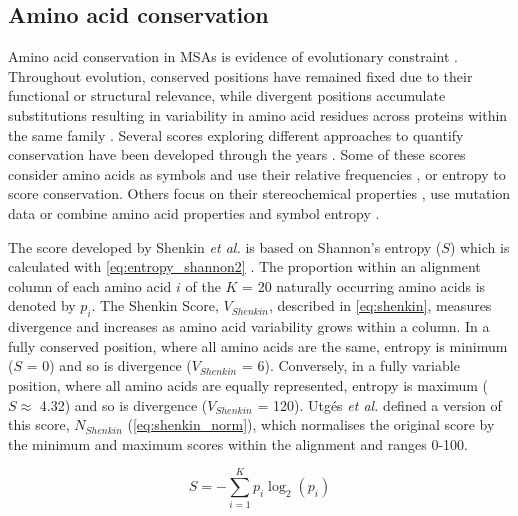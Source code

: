 \subsection{Amino acid conservation}

Amino acid conservation in MSAs is evidence of evolutionary constraint \cite{DAYHOFF_1978_PAM}. Throughout evolution, conserved positions have remained fixed due to their functional or structural relevance, while divergent positions accumulate substitutions resulting in variability in amino acid residues across proteins within the same family \cite{ZUCKERKANDL_1965_DIVERGENCE}. Several scores exploring different approaches to quantify conservation have been developed through the years \cite{VALDAR_2002_SCORES}. Some of these scores consider amino acids as symbols and use their relative frequencies \cite{WU_1970_SCORE, JORES_1990_SCORE, LOCKLESS_1999_SCORE}, or entropy \cite{SANDER_1991_SCORE, SHENKIN_1991_SCORE, GERSTEIN_1995_SCORE} to score conservation. Others focus on their stereochemical properties \cite{TAYLOR_1986_PROPERTIES, ZVELEBIL_1987_PREDICTION}, use mutation data \cite{KARLIN_1996_SCORE, THOMPSON_1997_SCORE, LANDGRAF_1999_SCORE, PILPEL_1999_SCORE, ARMON_2001_SCORE, VALDAR_2001_SCORE} or combine amino acid properties and symbol entropy \cite{WILLIAMSON_1995_SCORE, MIRNY_1999_SCORE}.

The score developed by Shenkin \textit{et al.} \cite{SHENKIN_1991_SCORE} is based on Shannon's entropy ($S$) which is calculated with \autoref{eq:entropy_shannon2} \cite{SHANNON_1948_ENTROPY}. The proportion within an alignment column of each amino acid $i$ of the $K$ = 20 naturally occurring amino acids is denoted by $p_i$. The Shenkin Score, $V_{Shenkin}$, described in \autoref{eq:shenkin}, measures divergence and increases as amino acid variability grows within a column. In a fully conserved position, where all amino acids are the same, entropy is minimum ($S$ = 0) and so is divergence ($V_{Shenkin}$ = 6). Conversely, in a fully variable position, where all amino acids are equally represented, entropy is maximum ($S \approx$ 4.32) and so is divergence ($V_{Shenkin}$ = 120). Utgés \textit{et al.} \cite{UTGES_2021_ANKS} defined a version of this score, $N_{Shenkin}$ (\autoref{eq:shenkin_norm}), which normalises the original score by the minimum and maximum scores within the alignment and ranges 0-100.

\begin{equation}
S = - \sum_{i=1}^{K} p_i \log_2(p_i)
\label{eq:entropy_shannon2}
\end{equation}

